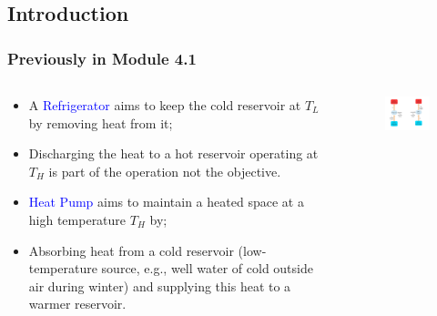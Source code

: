 \documentclass[10pt,compress]{beamer}
\begin{document}
\subsection{Introduction}
\begin{frame}
 \frametitle{Previously in Module 4.1}
  \begin{columns}
   \begin{column}[c]{0.45\linewidth}
    \begin{itemize}
     \item <1-> A \textcolor{blue}{Refrigerator} aims to keep the cold reservoir at $T_{L}$ by removing heat from it;
     \item <2-> Discharging the heat to a hot reservoir operating at $T_{H}$ is part of the operation not the objective.
     \item <3-> \textcolor{blue}{Heat Pump} aims to maintain a heated space at a high temperature $T_{H}$ by;
     \item <4-> Absorbing heat from a cold reservoir (low-temperature source, e.g., well water of cold outside air during winter) and supplying this heat to a warmer reservoir.
    \end{itemize}
   \end{column}
   \begin{column}[c]{0.55\linewidth}
    \begin{figure}%
     \begin{center}
      \includegraphics[width=7.5cm,clip]{./Pics/Overview_Refrig2}
     \end{center}
    \end{figure}  
   \end{column}  
  \end{columns}
\end{frame}
\end{document}
